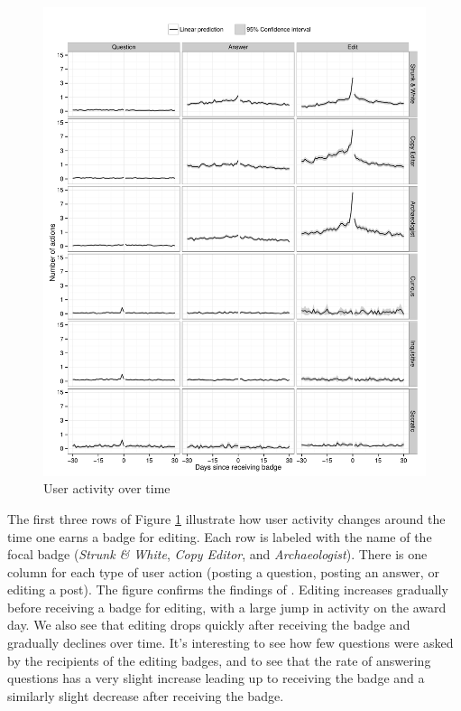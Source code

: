 \documentclass[conference]{IEEEtran}
\newcommand{\1}{\mathds{1}}
\begin{document}
\begin{figure}
  \centering
  \caption{User activity over time}
  \label{fig:badges}
  \includegraphics[width=\textwidth]{../figures/badges.pdf}
\end{figure}

The first three rows of Figure \ref{fig:badges} illustrate how user activity changes around the time one earns a badge for editing. Each row is labeled with the name of the focal badge (\textit{Strunk \& White}, \textit{Copy Editor}, and \textit{Archaeologist}). There is one column for each type of user action (posting a question, posting an answer, or editing a post). The figure confirms the findings of \citet{Grant2013}. Editing increases gradually before receiving a badge for editing, with a large jump in activity on the award day. We also see that editing drops quickly after receiving the badge and gradually declines over time. It's interesting to see how few questions were asked by the recipients of the editing badges, and to see that the rate of answering questions has a very slight increase leading up to receiving the badge and a similarly slight decrease after receiving the badge.
\end{document}
